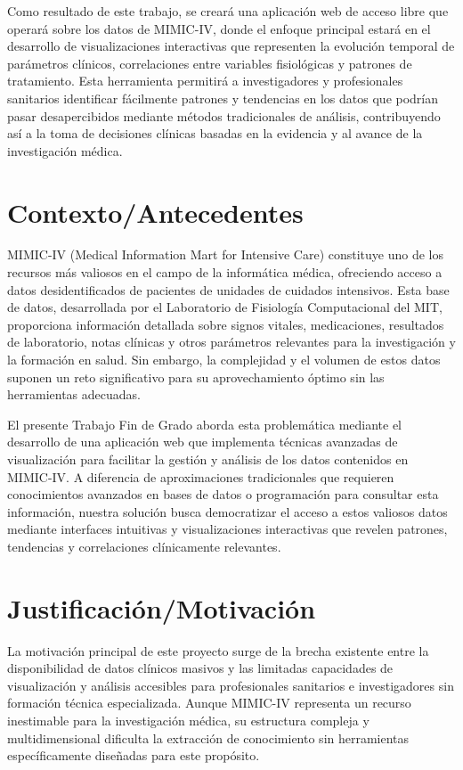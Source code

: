 Como resultado de este trabajo, se creará una aplicación web de acceso libre que operará sobre los datos de MIMIC-IV, donde el enfoque principal estará en el desarrollo de visualizaciones interactivas que representen la evolución temporal de parámetros clínicos, correlaciones entre variables fisiológicas y patrones de tratamiento. Esta herramienta permitirá a investigadores y profesionales sanitarios identificar fácilmente patrones y tendencias en los datos que podrían pasar desapercibidos mediante métodos tradicionales de análisis, contribuyendo así a la toma de decisiones clínicas basadas en la evidencia y al avance de la investigación médica.

\section{Contexto/Antecedentes}

MIMIC-IV (Medical Information Mart for Intensive Care) constituye uno de los recursos más valiosos en el campo de la informática médica, ofreciendo acceso a datos desidentificados de pacientes de unidades de cuidados intensivos. Esta base de datos, desarrollada por el Laboratorio de Fisiología Computacional del MIT, proporciona información detallada sobre signos vitales, medicaciones, resultados de laboratorio, notas clínicas y otros parámetros relevantes para la investigación y la formación en salud. Sin embargo, la complejidad y el volumen de estos datos suponen un reto significativo para su aprovechamiento óptimo sin las herramientas adecuadas.

El presente Trabajo Fin de Grado aborda esta problemática mediante el desarrollo de una aplicación web que implementa técnicas avanzadas de visualización para facilitar la gestión y análisis de los datos contenidos en MIMIC-IV. A diferencia de aproximaciones tradicionales que requieren conocimientos avanzados en bases de datos o programación para consultar esta información, nuestra solución busca democratizar el acceso a estos valiosos datos mediante interfaces intuitivas y visualizaciones interactivas que revelen patrones, tendencias y correlaciones clínicamente relevantes.

\section{Justificación/Motivación}

La motivación principal de este proyecto surge de la brecha existente entre la disponibilidad de datos clínicos masivos y las limitadas capacidades de visualización y análisis accesibles para profesionales sanitarios e investigadores sin formación técnica especializada. Aunque MIMIC-IV representa un recurso inestimable para la investigación médica, su estructura compleja y multidimensional dificulta la extracción de conocimiento sin herramientas específicamente diseñadas para este propósito.

